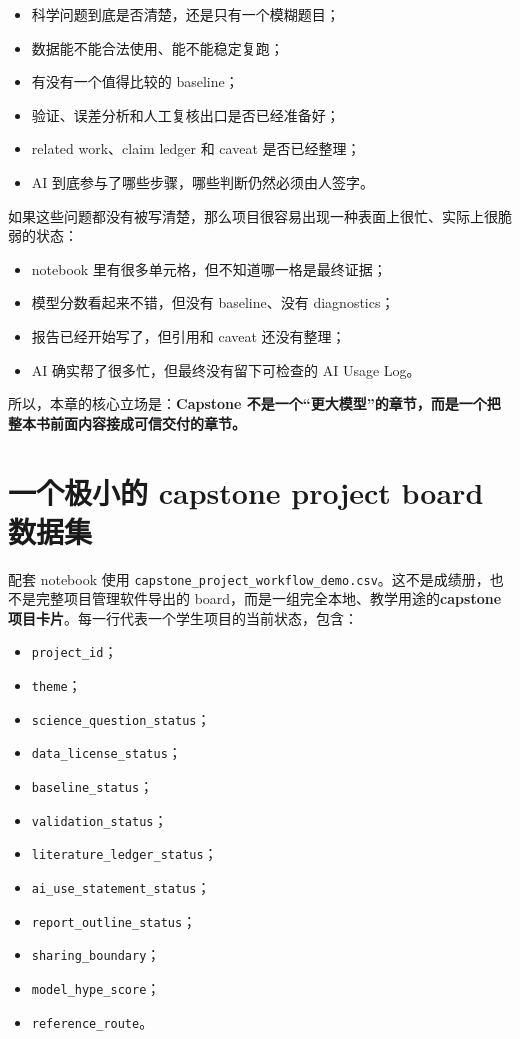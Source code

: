 \begin{itemize}
    \item 科学问题到底是否清楚，还是只有一个模糊题目；
    \item 数据能不能合法使用、能不能稳定复跑；
    \item 有没有一个值得比较的 baseline；
    \item 验证、误差分析和人工复核出口是否已经准备好；
    \item related work、claim ledger 和 caveat 是否已经整理；
    \item AI 到底参与了哪些步骤，哪些判断仍然必须由人签字。
\end{itemize}

如果这些问题都没有被写清楚，那么项目很容易出现一种表面上很忙、实际上很脆弱的状态：

\begin{itemize}
    \item notebook 里有很多单元格，但不知道哪一格是最终证据；
    \item 模型分数看起来不错，但没有 baseline、没有 diagnostics；
    \item 报告已经开始写了，但引用和 caveat 还没有整理；
    \item AI 确实帮了很多忙，但最终没有留下可检查的 AI Usage Log。
\end{itemize}

所以，本章的核心立场是：\textbf{Capstone 不是一个“更大模型”的章节，而是一个把整本书前面内容接成可信交付的章节。}

\section{一个极小的 capstone project board 数据集}

配套 notebook 使用 \nolinkurl{capstone_project_workflow_demo.csv}。这不是成绩册，也不是完整项目管理软件导出的 board，而是一组完全本地、教学用途的\textbf{capstone 项目卡片}。每一行代表一个学生项目的当前状态，包含：

\begin{itemize}
    \item \texttt{project\_id}；
    \item \texttt{theme}；
    \item \texttt{science\_question\_status}；
    \item \texttt{data\_license\_status}；
    \item \texttt{baseline\_status}；
    \item \texttt{validation\_status}；
    \item \texttt{literature\_ledger\_status}；
    \item \texttt{ai\_use\_statement\_status}；
    \item \texttt{report\_outline\_status}；
    \item \texttt{sharing\_boundary}；
    \item \texttt{model\_hype\_score}；
    \item \texttt{reference\_route}。
\end{itemize}

